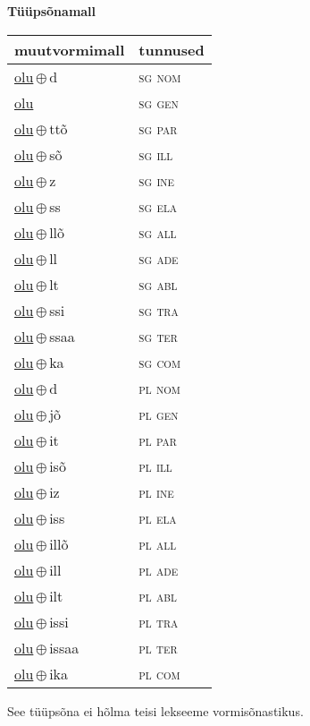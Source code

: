 

\vspace{3.5em}
\noindent \begin{minipage}{\textwidth}
\noindent \textbf{Tüüpsõnamall \,}\\

\begin{sideways}
\begin{tabular}{l l}
muutvormimall & tunnused \\
\hline
\underline{olu}\,$\oplus$\,d & \textsc{ sg nom } \\
\underline{olu} & \textsc{ sg gen } \\
\underline{olu}\,$\oplus$\,ttõ & \textsc{ sg par } \\
\underline{olu}\,$\oplus$\,sõ & \textsc{ sg ill } \\
\underline{olu}\,$\oplus$\,z & \textsc{ sg ine } \\
\underline{olu}\,$\oplus$\,ss & \textsc{ sg ela } \\
\underline{olu}\,$\oplus$\,llõ & \textsc{ sg all } \\
\underline{olu}\,$\oplus$\,ll & \textsc{ sg ade } \\
\underline{olu}\,$\oplus$\,lt & \textsc{ sg abl } \\
\underline{olu}\,$\oplus$\,ssi & \textsc{ sg tra } \\
\underline{olu}\,$\oplus$\,ssaa & \textsc{ sg ter } \\
\underline{olu}\,$\oplus$\,ka & \textsc{ sg com } \\
\underline{olu}\,$\oplus$\,d & \textsc{ pl nom } \\
\underline{olu}\,$\oplus$\,jõ & \textsc{ pl gen } \\
\underline{olu}\,$\oplus$\,it & \textsc{ pl par } \\
\underline{olu}\,$\oplus$\,isõ & \textsc{ pl ill } \\
\underline{olu}\,$\oplus$\,iz & \textsc{ pl ine } \\
\underline{olu}\,$\oplus$\,iss & \textsc{ pl ela } \\
\underline{olu}\,$\oplus$\,illõ & \textsc{ pl all } \\
\underline{olu}\,$\oplus$\,ill & \textsc{ pl ade } \\
\underline{olu}\,$\oplus$\,ilt & \textsc{ pl abl } \\
\underline{olu}\,$\oplus$\,issi & \textsc{ pl tra } \\
\underline{olu}\,$\oplus$\,issaa & \textsc{ pl ter } \\
\underline{olu}\,$\oplus$\,ika & \textsc{ pl com } \\
\end{tabular}
\end{sideways}
\label{tab:tüüpsõnamall-olud}

\end{minipage}

 
\vspace{1em}
\noindent See tüüpsõna ei hõlma teisi lekseeme vormi\-sõnastikus.
